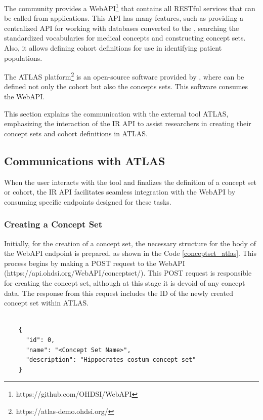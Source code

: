 The {\ohdsi} community provides a WebAPI\footnote{https://github.com/OHDSI/WebAPI} that contains all {\ohdsi} RESTful services that can be called from {\ohdsi} applications. This API has many features, such as providing a centralized API for working with databases converted to the {\omop}, searching the {\omop} standardized vocabularies for medical concepts and constructing concept sets. Also, it allows defining cohort definitions for use in identifying patient populations.

The ATLAS platform\footnote{https://atlas-demo.ohdsi.org/} is an open-source software provided by {\ohdsi}, where can be defined not only the cohort but also the concepts sets. This software consumes the {\ohdsi} WebAPI.

This section explains the communication with the external tool ATLAS, emphasizing the interaction of the IR API to assist researchers in creating their concept sets and cohort definitions in ATLAS.



\subsection{Communications with ATLAS}

When the user interacts with the tool and finalizes the definition of a concept set or cohort, the IR API facilitates seamless integration with the {\ohdsi} WebAPI by consuming specific endpoints designed for these tasks.

\subsubsection{Creating a Concept Set}

Initially, for the creation of a concept set, the necessary structure for the body of the {\ohdsi} WebAPI endpoint is prepared, as shown in the Code \ref{conceptset_atlas}. This process begins by making a POST request to the {\ohdsi} WebAPI (https://api.ohdsi.org/WebAPI/conceptset/). This POST request is responsible for creating the concept set, although at this stage it is devoid of any concept data. The response from this request includes the ID of the newly created concept set within ATLAS.

\begin{listing}[H]
  \begin{verbatim}
      
    { 
      "id": 0, 
      "name": "<Concept Set Name>", 
      "description": "Hippocrates costum concept set"
    }

  \end{verbatim}
  \caption{The body to create the Concept Set in ATLAS.}
  \label{conceptset_atlas}
\end{listing}


